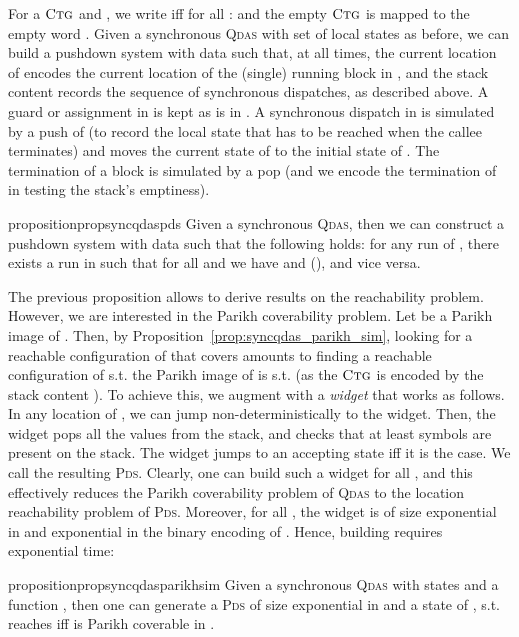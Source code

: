 \documentclass[runningheads,oribibl,]{article}
\newif\ifincludeproofs
\newcommand{\pds}{\textsc{Pds}\xspace}
\newcommand{\qdas}{\textsc{Qdas}\xspace}
\newcommand{\ctg}{\ensuremath{\textsc{Ctg}}\xspace}
\newcommand{\inputproof}[1]{\ifincludeproofs\else\fi}
\begin{document}
                                For a \ctg  and , we write
  iff for all :
 and the empty \ctg is mapped to the empty word .
Given a synchronous \qdas  with set of local
states  as before, we can build a pushdown system with data
 such that, at all times, the current location of  encodes the
current location of the (single) running block in , and the stack
content records the sequence of synchronous dispatches, as described
above. A guard or assignment in  is kept as is in . A
synchronous dispatch  in  is simulated
by a push of  (to record the local state that has to be reached
when the callee terminates) and moves the current state of  to
the initial state of . The termination of a block is simulated
by a pop (and we encode the termination of
 in testing the stack's emptiness).

\begin{restatable}{proposition}{propsyncqdaspds}
\label{prop:sync_qdas_pds}  Given a synchronous \qdas , then we can construct  a
  pushdown system with data  such that the following holds:
  for any
  run  of ,
  there exists a run  in  such that
  for all  and 
  we have  and  (),
  and vice versa.
\end{restatable}
\inputproof{proofs/lem:sync_qdas_pds.tex}

The previous proposition allows to derive results on the reachability
problem. However, we are interested in the Parikh coverability
problem. Let  be a Parikh image of . Then, by
Proposition~\ref{prop:syncqdas_parikh_sim}, looking for a reachable
configuration of  that covers  amounts to finding a reachable
configuration  of  s.t. the Parikh image
 of  is s.t.   (as the \ctg is encoded by the stack
content ). To achieve this, we augment  with a
\emph{widget} that works as follows. In any location of , we
can jump non-deterministically to the widget. Then, the widget pops
all the values from the stack, and checks that at least  symbols
 are present on the stack. The widget jumps to an accepting state
iff it is the case.  We call  the resulting
\pds. Clearly, one can build such a widget for all , and this
effectively reduces the Parikh coverability problem of \qdas to the
location reachability problem of \pds. Moreover, for all , the
widget is of size exponential in  and exponential
in the binary encoding of
 . Hence, building 
requires exponential time:

\begin{restatable}{proposition}{propsyncqdasparikhsim}
  \label{prop:syncqdas_parikh_sim}
  Given a synchronous \qdas  with states  and a function
  \mbox{}, then one can generate a \pds
   of size exponential in  and a state  of
  , s.t.  reaches  iff  is Parikh
  coverable in .
\end{restatable}
\end{document}
